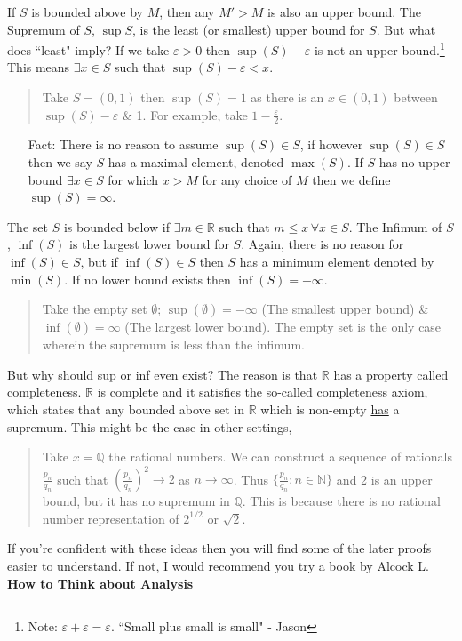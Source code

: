 \documentclass[10pt]{article}
\begin{document}
If $S$ is bounded above by $M$, then any $M'>M$ is also an upper bound. The Supremum of $S$, $\sup{S}$, is the least (or smallest) upper bound for $S$. But what does ``least" imply? If we take $\varepsilon>0$ then $\sup{(S)}-\varepsilon$ is not an upper bound.\footnote{Note: $\varepsilon+\varepsilon=\varepsilon$. ``Small plus small is small" - Jason} This means $\exists x\in S$ such that $\sup{(S)}-\varepsilon<x$. 
\begin{quote}
    Take $S=(0,1)$ then $\sup{(S)}=1$ as there is an $x\in(0,1)$ between $\sup(S)-\varepsilon$ \& 1. For example, take $1-\frac{\varepsilon}{2}$.
\end{quote}
\begin{itemize}
    \item[Fact:] There is no reason to assume $\sup(S)\in S$, if however $\sup(S)\in S$ then we say $S$ has a maximal element, denoted $\max(S)$. If $S$ has no upper bound $\exists x\in S$ for which $x>M$ for any choice of $M$ then we define $\sup(S)=\infty$.
\end{itemize}
The set $S$ is bounded below if $\exists m\in\mathbb{R}$ such that $m\leq x\,\forall x\in S$. The Infimum of $S$, $\inf{(S)}$ is the largest lower bound for $S$. Again, there is no reason for $\inf{(S)}\in S$, but if $\inf{(S)}\in S$ then $S$ has a minimum element denoted by $\min{(S)}$. If no lower bound exists then $\inf{(S)}=-\infty$.
\begin{quote}
    Take the empty set $\emptyset$; $\sup(\emptyset)=-\infty$ (The smallest upper bound) \& $\inf(\emptyset)=\infty$ (The largest lower bound). The empty set is the only case wherein the supremum is less than the infimum.
\end{quote}
But why should sup or inf even exist? The reason is that $\mathbb{R}$ has a property called completeness. $\mathbb{R}$ is complete and it satisfies the so-called completeness axiom, which states that any bounded above set in $\mathbb{R}$ which is non-empty \underline{has} a supremum. This might be the case in other settings,
\begin{quote}
    Take $x=\mathbb{Q}$ the rational numbers. We can construct a sequence of rationals $\frac{p_{n}}{q_{n}}$ such that $(\frac{p_{n}}{q_{n}})^{2}\to2$ as $n\to\infty$. Thus $\{\frac{p_{n}}{q_{n}}:n\in\mathbb{N}\}$ and 2 is an upper bound, but it has no supremum in $\mathbb{Q}$. This is because there is no rational number representation of $2^{1/2}$ or $\sqrt{2}$.
\end{quote}
If you're confident with these ideas then you will find some of the later proofs easier to understand. If not, I would recommend you try a book by Alcock L. \textbf{How to Think about Analysis}\cite{Book 4}
\end{document}
